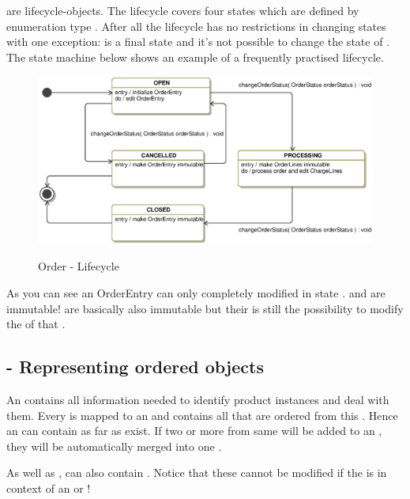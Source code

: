  are lifecycle-objects. The lifecycle covers four states which are defined by enumeration type . After all the lifecycle has no restrictions in changing states with one exception:  is a final state and it's not possible to change the state of  . The state machine below shows an example of a frequently practised lifecycle.

\begin{figure}[ht]
	\centering
  \includegraphics[width=1.0\textwidth]{images/OrderEntryState.eps}
	\label{order_statemachine}
	\caption{Order - Lifecycle}
\end{figure}  

As you can see an OrderEntry can only completely modified in state .  and   are immutable!   are basically also immutable but their is still the possibility to modify the  of that . 

\subsection{ - Representing ordered objects}
An  contains all information needed to identify product instances and deal with them. Every  is mapped to an  and contains all  that are ordered from this . Hence an  can contain as far  as  exist. If two or more  from same  will be added to an , they will be automatically merged into one .

As well as ,  can also contain . Notice that these  cannot be modified if the  is in context of an  or  ! 

